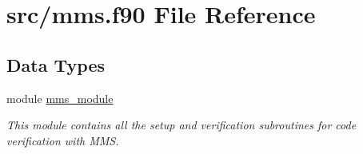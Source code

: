 \hypertarget{mms_8f90}{\section{src/mms.f90 File Reference}
\label{mms_8f90}
}
\subsection*{Data Types}
\begin{DoxyCompactItemize}
\item 
module \hyperlink{classmms__module}{mms\-\_\-module}
\begin{DoxyCompactList}\small\item\em This module contains all the setup and verification subroutines for code verification with M\-M\-S. \end{DoxyCompactList}\end{DoxyCompactItemize}
